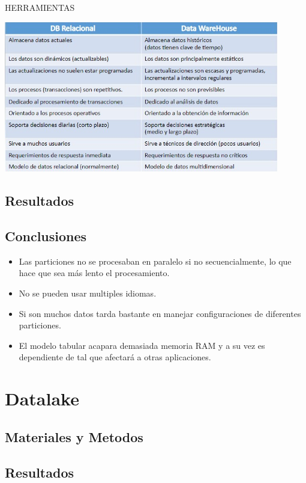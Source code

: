 \documentclass[preprint,12pt]{elsarticle}
\begin{document}
HERRAMIENTAS\\
\begin{center}
	\includegraphics[width=12cm]{./Imagenes/imagen5} 
\end{center}

\subsection{Resultados}

\subsection{Conclusiones}

\begin{itemize}
	\item Las particiones no se procesaban en paralelo si no secuencialmente, lo que hace que sea más lento el procesamiento.
	\item No se pueden usar multiples idiomas.
	\item Si son muchos datos tarda bastante en manejar configuraciones de diferentes particiones.
	\item El modelo tabular acapara demasiada memoria RAM y a su vez es dependiente de tal que afectará a otras aplicaciones.
\end{itemize}

\section{Datalake}

\subsection{Materiales y Metodos}

\subsection{Resultados}
\end{document}

